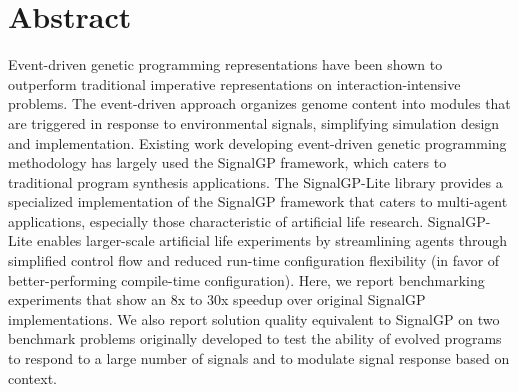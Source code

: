 \section{Abstract}

Event-driven genetic programming representations have been shown to outperform traditional imperative representations on interaction-intensive problems.
The event-driven approach organizes genome content into modules that are triggered in response to environmental signals, simplifying simulation design and implementation.
Existing work developing event-driven genetic programming methodology has largely used the SignalGP framework, which caters to traditional program synthesis applications.
The SignalGP-Lite library provides a specialized implementation of the SignalGP framework that caters to multi-agent applications, especially those characteristic of artificial life research.
SignalGP-Lite enables larger-scale artificial life experiments by streamlining agents through simplified control flow and reduced run-time configuration flexibility (in favor of better-performing compile-time configuration).
Here, we report benchmarking experiments that show an 8x to 30x speedup over original SignalGP implementations.
We also report solution quality equivalent to SignalGP on two benchmark problems originally developed to test the ability of evolved programs to respond to a large number of signals and to modulate signal response based on context.
